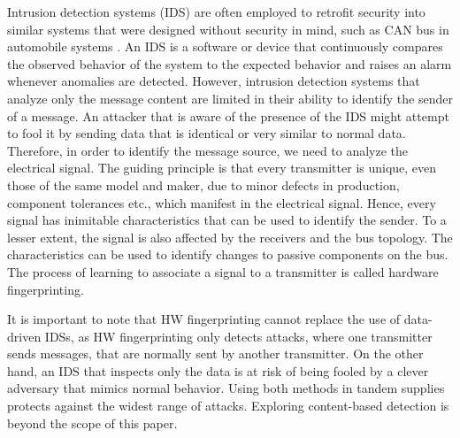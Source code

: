 \documentclass[conference]{IEEEtran}
\begin{document}
  Intrusion detection systems (IDS) are often employed to retrofit security into similar systems that were designed without security in mind, such as CAN bus in automobile systems \cite{muter2011entropy}. An IDS is a software or device that continuously compares the observed behavior of the system to the expected behavior and raises an alarm whenever anomalies are detected. However, intrusion detection systems that analyze only the message content are limited in their ability to identify the sender of a message.  An attacker that is aware of the presence of the IDS might attempt to fool it by sending data that is identical or very similar to normal data.  Therefore, in order to identify the message source, we need to analyze the electrical signal. The guiding principle is that every transmitter is unique, even those of the same model and maker, due to minor defects in production, component tolerances etc., which manifest in the electrical signal. Hence, every signal has inimitable characteristics that can be used to identify the sender. To a lesser extent, the signal is also affected by the receivers and the bus topology. The characteristics can be used to identify changes to passive components on the bus. The process of learning to associate a signal to a transmitter is called hardware fingerprinting.
  
  It is important to note that HW fingerprinting cannot replace the use of data-driven IDSs, as HW fingerprinting only detects attacks, where one transmitter sends messages, that are normally sent by another transmitter. On the other hand, an IDS that inspects only the data is at risk of being fooled by a clever adversary that mimics normal behavior. Using both methods in tandem supplies protects against the widest range of attacks. Exploring content-based detection is beyond the scope of this paper.
  
\end{document}
